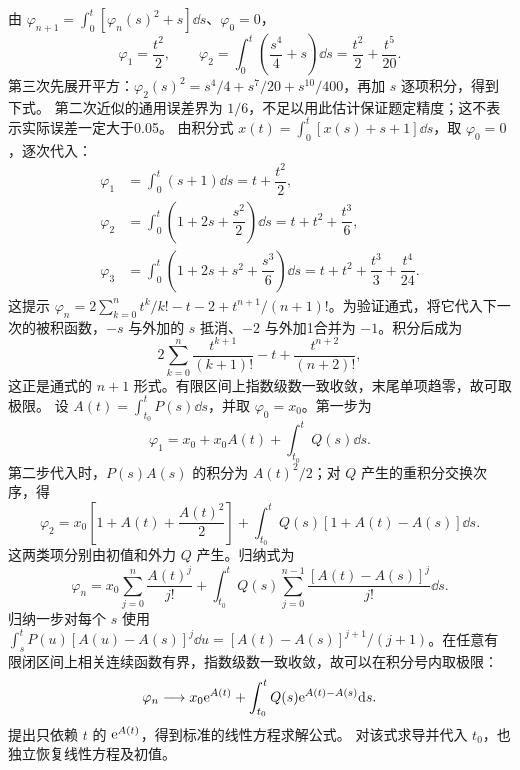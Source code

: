 由 $\displaystyle \varphi_{n+1}=\int_0^t[\varphi_n(s)^2+s]\dd s$、$\varphi_0=0$，
\[
\varphi_1=\dfrac{t^2}{2},\qquad
\varphi_2=\int_0^t\left(\dfrac{s^4}{4}+s\right)\dd s
=\dfrac{t^2}{2}+\dfrac{t^5}{20}.
\]
第三次先展开平方：$\varphi_2(s)^2=s^4/4+s^7/20+s^{10}/400$，再加 $s$ 逐项积分，得到下式。
第二次近似的通用误差界为 $1/6$，不足以用此估计保证题定精度；这不表示实际误差一定大于0.05。
由积分式 $\displaystyle x(t)=\int_0^t[x(s)+s+1]\dd s$，取 $\varphi_0=0$，逐次代入：
\[
\begin{aligned}
\varphi_1&=\int_0^t(s+1)\dd s=t+\dfrac{t^2}{2},\\
\varphi_2&=\int_0^t\left(1+2s+\dfrac{s^2}{2}\right)\dd s
=t+t^2+\dfrac{t^3}{6},\\
\varphi_3&=\int_0^t\left(1+2s+s^2+\dfrac{s^3}{6}\right)\dd s
=t+t^2+\dfrac{t^3}{3}+\dfrac{t^4}{24}.
\end{aligned}
\]
这提示 $\varphi_n=2\sum_{k=0}^nt^k/k!-t-2+t^{n+1}/(n+1)!$。为验证通式，将它代入下一次的被积函数，$-s$ 与外加的 $s$ 抵消、$-2$ 与外加1合并为 $-1$。积分后成为
\[
2\sum_{k=0}^n\dfrac{t^{k+1}}{(k+1)!}-t+\dfrac{t^{n+2}}{(n+2)!},
\]
这正是通式的 $n+1$ 形式。有限区间上指数级数一致收敛，末尾单项趋零，故可取极限。
设 $\displaystyle A(t)=\int_{t_0}^tP(s)\dd s$，并取 $\varphi_0=x_0$。第一步为
\[
\varphi_1=x_0+x_0A(t)+\int_{t_0}^tQ(s)\dd s.
\]
第二步代入时，$P(s)A(s)$ 的积分为 $A(t)^2/2$；对 $Q$ 产生的重积分交换次序，得
\[
\varphi_2=x_0\left[1+A(t)+\dfrac{A(t)^2}{2}\right]
+\int_{t_0}^tQ(s)[1+A(t)-A(s)]\dd s.
\]
这两类项分别由初值和外力 $Q$ 产生。归纳式为
\[
\varphi_n=x_0\sum_{j=0}^n\dfrac{A(t)^j}{j!}
+\int_{t_0}^tQ(s)\sum_{j=0}^{n-1}\dfrac{[A(t)-A(s)]^j}{j!}\dd s.
\]
归纳一步对每个 $s$ 使用 $\displaystyle \int_s^tP(u)[A(u)-A(s)]^j\dd u=[A(t)-A(s)]^{j+1}/(j+1)$。在任意有限闭区间上相关连续函数有界，指数级数一致收敛，故可以在积分号内取极限：
\[
\varphi_n\longrightarrow x_0\mathrm e^{A(t)}+
\int_{t_0}^tQ(s)\mathrm e^{A(t)-A(s)}\mathrm d s.
\]
提出只依赖 $t$ 的 $\mathrm e^{A(t)}$，得到标准的线性方程求解公式。
对该式求导并代入 $t_0$，也独立恢复线性方程及初值。
